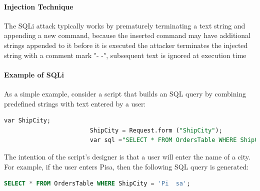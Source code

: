 \documentclass{article}
\begin{document}
                    \paragraph{Injection Technique}
                    The SQLi attack typically works by prematurely terminating a text string and appending a new command, because the inserted command may have additional strings
                    appended to it before it is executed the attacker terminates the injected string with a comment mark "- -", subsequent text is ignored at execution time

                    \paragraph{Example of SQLi}
                    As a simple example, consider a script that builds an SQL query
                    by combining predefined strings with text entered by a user:
                    \begin{lstlisting}[language=SQL]
                        var ShipCity;
                        ShipCity = Request.form ("ShipCity");
                        var sql ="SELECT * FROM OrdersTable WHERE ShipCity = '" + ShipCity +" ' ";
                    \end{lstlisting}
                    The intention of the script's designer is that a user will enter the
                    name of a city. For example, if the user enters Pisa, then the
                    following SQL query is generated:

                    \begin{lstlisting}[language=SQL]
                        SELECT * FROM OrdersTable WHERE ShipCity = 'Pi  sa';
                    \end{lstlisting}
                
                
                



















































                
\end{document}
